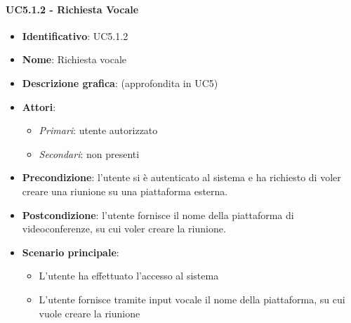 \paragraph{UC5.1.2 - Richiesta Vocale}
\begin{itemize}
   \item \textbf{Identificativo}: UC5.1.2
   \item \textbf{Nome}: Richiesta vocale
   \item \textbf{Descrizione grafica}: (approfondita in UC5)
   \item \textbf{Attori}:
   \begin{itemize} 
       \item \textit{Primari}: utente autorizzato
       \item \textit{Secondari}: non presenti
   \end{itemize}
       \item \textbf{Precondizione}: l'utente si è autenticato al sistema e ha richiesto di voler creare una riunione su una piattaforma esterna.
       \item \textbf{Postcondizione}: l'utente fornisce il nome della piattaforma di videoconferenze, su cui voler creare la riunione.
    \item \textbf{Scenario principale}: 
       \begin{itemize}
           \item L'utente ha effettuato l'accesso al sistema 
           \item L'utente fornisce tramite input vocale il nome della piattaforma, su cui vuole creare la riunione
       \end{itemize}
\end{itemize}


